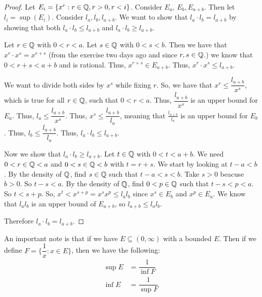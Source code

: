 \documentclass{report}
\begin{document}
\begin{proof}
    Let $E_i = \{ x^r : r \in \QQ, r > 0, r < i\}$. Consider $E_a$, $E_b, E_{a+b}$. Then let $l_i = \sup(E_i)$. Consider $l_a, l_b, l_{a+b}$. We want to show that $l_a \cdot l_b = l_{a+b}$ by showing that both $l_a \cdot l_b \leq l_{a+b}$ and $l_a \cdot l_b \geq l_{a+b}$.

    Let $r \in \QQ$ with $0 < r < a$. Let $s \in \QQ$ with $0 < s < b$. Then we have that $x^r \cdot x^s = x^{r+s}$ (from the exercise two days ago and since $r,s \in \QQ$.) we know that $0 < r + s < a + b$ and is rational. Thus, $x^{r+s} \in E_{a+b}$. Thus, $x^r \cdot x^s \leq l_{a+b}$.

    We want to divide both sides by $x^s$ while fixing $r$. So, we have that $ x ^r \leq \dfrac{l_{a+b}}{x^s}$, which is true for all $r \in \QQ$, such that $0 < r < a$. Thus, $\dfrac{l_{a+b}}{x^s}$ is an upper bound for $E_a$. Thus, $l_a \leq \dfrac{l_{a+b}}{x^s}$. Thus, $ x^s \leq \dfrac{l_{a+b}}{l_a}$, meaning that $\frac{l_{a+b}}{l_a}$ is an upper bound for $E_b$. Thus, $l_b \leq \dfrac{l_{a+b}}{l_a}$. Thus, $l_a \cdot l_b \leq l_{a+b}$.

    Now we show that $l_a \cdot l_b \geq l_{a+b}$. Let $t \in \QQ$ with $0 < t < a + b$. We need $0 < r \in \QQ < a$ and $0 < s \in \QQ < b$ with $t = r + s$. We start by looking at $t - a < b$. By the density of $\QQ$, find $s \in \QQ$ such that $t-a < s < b$. Take $s > 0$ beacuse $b > 0$. So $t -s < a$. By the density of $\QQ$, find $0 < p \in \QQ$ such that $t-s < p < a$. So $t < s + p$. So, $x^t < x^{s+p} = x^{s}x^{p} \leq l_a l_b$ since $x^s \in E_b$ and $x^p \in E_a$. We know that $l_a l_b$ is an upper bound of $E_{a+b}$, so $l_{a+b} \leq l_a l_b$.

    Therefore $l_a \cdot l_b = l_{a+b}$.
\end{proof}
An important note is that if we have $E \subseteq (0, \infty)$ with a bounded $E$. Then if we define $F = \{ \dfrac{1}{x} : x \in E\}$, then we have the following:
\begin{align*}
    \sup E &= \dfrac{1}{\inf F} \\
    \inf E &= \dfrac{1}{\sup F}
\end{align*}
\end{document}
